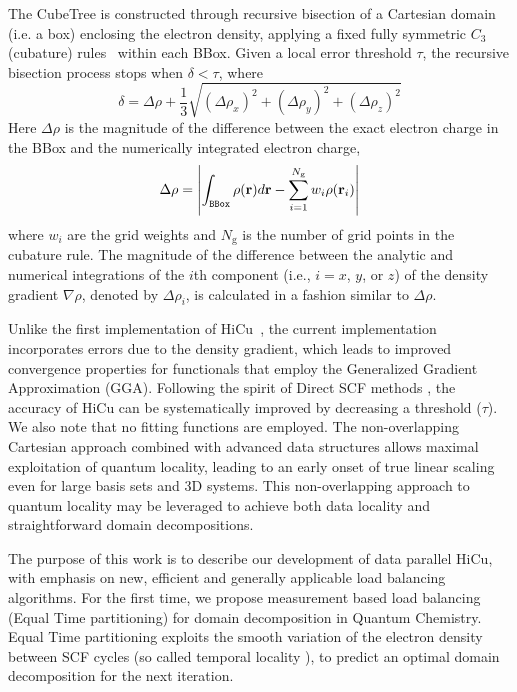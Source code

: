 \commentoutA{\documentclass[prl,aps,twocolumn,showpacs,twocolumngrid,superbib]{revtex4}}
\begin{document}
The CubeTree is constructed through recursive bisection of a Cartesian
domain (i.e. a box) enclosing the electron density, applying a fixed
fully symmetric $C_3$ (cubature) rules~\cite{Stroud71} within each
BBox.  Given a local error threshold $\tau$, the recursive bisection
process stops when $\delta < \tau$, where
\begin{equation}
\delta = \Delta \rho+ \frac{1}{3} \sqrt{(\Delta \rho_x)^2 + (\Delta
\rho_y)^2 + (\Delta \rho_z)^2}
\label{eq:delta}
\end{equation}
Here $\Delta \rho$ is the magnitude of the difference between the
exact electron charge in the BBox and the numerically integrated
electron charge,
\begin{equation}
\Delta \rho = \left|\int_{\tt{BBox}}\rho({\bf r}) d{\bf r} -
\sum_{i=1}^{N_{\mathrm{g}}} w_i\rho({\bf r}_i)\right|
\end{equation}
where $w_i$ are the grid weights and $N_{\mathrm{g}}$ is the number of
grid points in the cubature rule. The magnitude of the difference
between the analytic and numerical integrations of the $i$th component
(i.e., $i = x$, $y$, or $z$) of the density gradient $\nabla \rho$,
denoted by $\Delta \rho_i $, is calculated in a fashion similar to
$\Delta \rho$.

Unlike the first implementation of HiCu~\cite{MChallacombe00A}, the
current implementation incorporates errors due to the density
gradient, which leads to improved convergence properties for
functionals that employ the Generalized Gradient Approximation (GGA).
Following the spirit of Direct SCF methods \cite{JAlmlof82,MHaser89},
the accuracy of HiCu can be systematically improved by decreasing a
threshold ($\tau$).  We also note that no fitting functions are
employed. The non-overlapping Cartesian approach combined with
advanced data structures allows maximal exploitation of quantum
locality, leading to an early onset of true linear scaling even for
large basis sets and 3D systems.  This non-overlapping approach to
quantum locality may be leveraged to achieve both data locality and
straightforward domain decompositions.

The purpose of this work is to describe our development of data
parallel HiCu, with emphasis on new, efficient and generally
applicable load balancing algorithms.
 For the first time, we propose measurement based load balancing
(Equal Time partitioning) for domain decomposition in Quantum
Chemistry. Equal Time partitioning exploits the smooth variation 
of the electron density between SCF cycles (so called temporal locality
\cite{JPilkington96}), to predict an optimal domain decomposition for
the next iteration.
\end{document}
